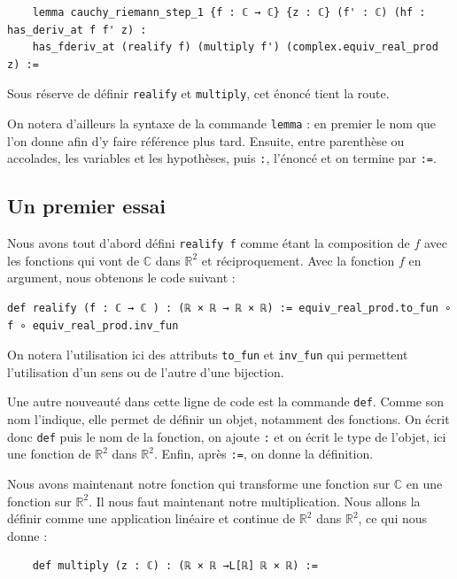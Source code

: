 \documentclass[a4paper, 11pt, twoside]{report}
\newcommand\R{\mathbb{R}}
\newcommand\C{\mathbb{C}}
\begin{document}
\begin{lstlisting}
	lemma cauchy_riemann_step_1 {f : ℂ → ℂ} {z : ℂ} (f' : ℂ) (hf : has_deriv_at f f' z) : 
	has_fderiv_at (realify f) (multiply f') (complex.equiv_real_prod z) :=
\end{lstlisting}
	
	Sous réserve de définir \verb|realify| et \verb|multiply|, cet énoncé tient la route.
	
	On notera d'ailleurs la syntaxe de la commande \verb|lemma| : en premier le nom que l'on donne afin d'y faire référence plus tard. Ensuite, entre parenthèse ou accolades, les variables et les hypothèses, puis \verb|:|, l'énoncé et on termine par \verb|:=|.
	
\subsection{Un premier essai}
	
Nous avons tout d'abord défini \verb|realify f| comme étant la composition de $f$ avec les fonctions qui vont de $\C$ dans $\R^2$ et réciproquement. Avec la fonction $f$ en argument, nous obtenons le code suivant :

\begin{lstlisting}
def realify (f : ℂ → ℂ ) : (ℝ × ℝ → ℝ × ℝ) := equiv_real_prod.to_fun ∘ f ∘ equiv_real_prod.inv_fun
\end{lstlisting}
	
On notera l'utilisation ici des attributs \verb|to_fun| et \verb|inv_fun| qui permettent l'utilisation d'un sens ou de l'autre d'une bijection.

Une autre nouveauté dans cette ligne de code est la commande \verb|def|. Comme son nom l'indique, elle permet de définir un objet, notamment des fonctions. On écrit donc \verb|def| puis le nom de la fonction, on ajoute \verb|:| et on écrit le type de l'objet, ici une fonction de $\R^2$ dans $\R^2$. Enfin, après \verb|:=|, on donne la définition.

\medskip

Nous avons maintenant notre fonction qui transforme une fonction sur $\C$ en une fonction sur $\R^2$. Il nous faut maintenant notre multiplication. Nous allons la définir comme une application linéaire et continue de $\R^2$ dans $\R^2$, ce qui nous donne :

\begin{lstlisting}
	def multiply (z : ℂ) : (ℝ × ℝ →L[ℝ] ℝ × ℝ) := 
\end{lstlisting}
\end{document}
